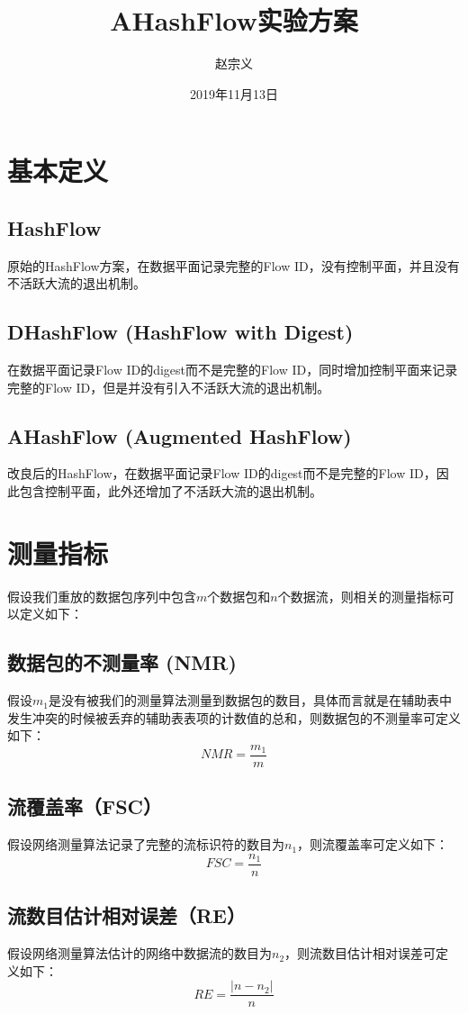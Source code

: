 \documentclass{article}
\title{AHashFlow实验方案}
\author{赵宗义}
\date{2019年11月13日}
\begin{document}
\maketitle

\tableofcontents

\section{基本定义}
\subsection{HashFlow}
原始的HashFlow方案，在数据平面记录完整的Flow ID，没有控制平面，并且没有不活跃大流的退出机制。

\subsection{DHashFlow (HashFlow with Digest)}
在数据平面记录Flow ID的digest而不是完整的Flow ID，同时增加控制平面来记录完整的Flow ID，但是并没有引入不活跃大流的退出机制。

\subsection{AHashFlow (Augmented HashFlow)}
改良后的HashFlow，在数据平面记录Flow ID的digest而不是完整的Flow ID，因此包含控制平面，此外还增加了不活跃大流的退出机制。

\section{测量指标}
假设我们重放的数据包序列中包含$m$个数据包和$n$个数据流，则相关的测量指标可以定义如下：

\subsection{数据包的不测量率  (NMR)}
假设$m_1$是没有被我们的测量算法测量到数据包的数目，具体而言就是在辅助表中发生冲突的时候被丢弃的辅助表表项的计数值的总和，则数据包的不测量率可定义如下：
$$
NMR = \frac{m_1}{m}
$$

\subsection{ 流覆盖率（FSC）}
假设网络测量算法记录了完整的流标识符的数目为$n_1$，则流覆盖率可定义如下：
$$
FSC = \frac{n_1}{n}
$$

\subsection{ 流数目估计相对误差（RE）}
假设网络测量算法估计的网络中数据流的数目为$n_2$，则流数目估计相对误差可定义如下：
$$
RE = \frac{|n - n_2|}{n}
$$
\end{document}
